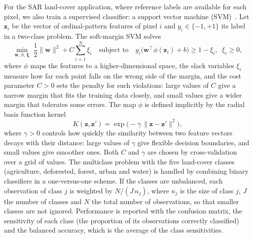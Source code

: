 For the SAR land-cover application, where reference labels are available for each pixel, we also train a supervised classifier: a support vector machine (SVM)~\cite{Cortes1995}. Let $\mathbf{z}_i$ be the vector of ordinal-pattern features of pixel $i$ and $y_i\in\{-1,+1\}$ its label in a two-class problem. The soft-margin SVM solves
\[
\min_{\mathbf{w},\,b,\,\boldsymbol{\xi}}\;\frac{1}{2}\|\mathbf{w}\|^2 + C\sum_{i=1}^{N}\xi_i
\quad\text{subject to}\quad
y_i\big(\mathbf{w}^\top\phi(\mathbf{z}_i)+b\big)\ge 1-\xi_i,\;\; \xi_i\ge 0,
\]
where $\phi$ maps the features to a higher-dimensional space, the slack variables $\xi_i$ measure how far each point falls on the wrong side of the margin, and the cost parameter $C>0$ sets the penalty for such violations: large values of $C$ give a narrow margin that fits the training data closely, and small values give a wider margin that tolerates some errors. The map $\phi$ is defined implicitly by the radial basis function kernel
\[
K(\mathbf{z},\mathbf{z}')=\exp\!\big(-\gamma\,\|\mathbf{z}-\mathbf{z}'\|^2\big),
\]
where $\gamma>0$ controls how quickly the similarity between two feature vectors decays with their distance: large values of $\gamma$ give flexible decision boundaries, and small values give smoother ones. Both $C$ and $\gamma$ are chosen by cross-validation over a grid of values. The multiclass problem with the five land-cover classes (agriculture, deforested, forest, urban and water) is handled by combining binary classifiers in a one-versus-one scheme. If the classes are unbalanced, each observation of class $j$ is weighted by $N/(J\,n_j)$, where $n_j$ is the size of class $j$, $J$ the number of classes and $N$ the total number of observations, so that smaller classes are not ignored. Performance is reported with the confusion matrix, the sensitivity of each class (the proportion of its observations correctly classified) and the balanced accuracy, which is the average of the class sensitivities.




